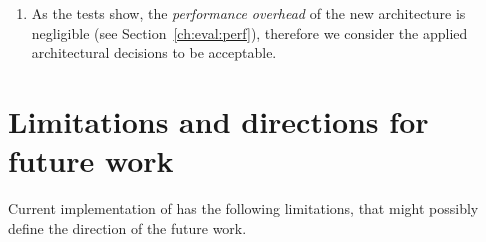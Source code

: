 \begin{enumerate}[label=\arabic*.]
\begin{enumerate}[label=\alph*.]
  \end{enumerate}
  
\item 
As the tests show, the \textit{performance overhead} of the new architecture is negligible (see Section~\ref{ch:eval:perf}), therefore we consider the applied architectural decisions to be acceptable.

\end{enumerate}


\section{Limitations and directions for future work}

Current implementation of \porthos[2] has the following limitations, that might possibly define the direction of the future work.

